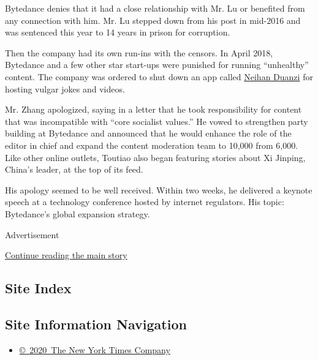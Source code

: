 Bytedance denies that it had a close relationship with Mr. Lu or
benefited from any connection with him. Mr. Lu stepped down from his
post in mid-2016 and was sentenced this year to 14 years in prison for
corruption.

Then the company had its own run-ins with the censors. In April 2018,
Bytedance and a few other star start-ups were punished for running
``unhealthy'' content. The company was ordered to shut down an app
called
\href{https://www.nytimes.com/2018/04/12/business/china-bytedance-duanzi-censor.html}{Neihan
Duanzi} for hosting vulgar jokes and videos.

Mr. Zhang apologized, saying in a letter that he took responsibility for
content that was incompatible with ``core socialist values.'' He vowed
to strengthen party building at Bytedance and announced that he would
enhance the role of the editor in chief and expand the content
moderation team to 10,000 from 6,000. Like other online outlets, Toutiao
also began featuring stories about Xi Jinping, China's leader, at the
top of its feed.

His apology seemed to be well received. Within two weeks, he delivered a
keynote speech at a technology conference hosted by internet regulators.
His topic: Bytedance's global expansion strategy.

Advertisement

\protect\hyperlink{after-bottom}{Continue reading the main story}

\hypertarget{site-index}{%
\subsection{Site Index}\label{site-index}}

\hypertarget{site-information-navigation}{%
\subsection{Site Information
Navigation}\label{site-information-navigation}}

\begin{itemize}
\tightlist
\item
  \href{https://help.nytimes.com/hc/en-us/articles/115014792127-Copyright-notice}{©~2020~The
  New York Times Company}
\end{itemize}

